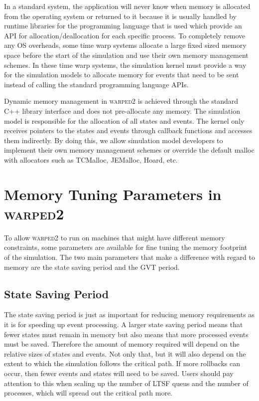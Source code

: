 \documentclass[11pt]{book}
\begin{document}
In a standard system, the application will never know when memory is allocated from the operating
system or returned to it because it is usually handled by runtime libraries for the programming
language that is used which provide an API for allocation/deallocation for each specific
process. To completely remove any OS overheads, some time warp systems allocate a large fixed
sized memory space before the start of the simulation and use their own memory management
schemes. In these time warp systems, the simulation kernel must provide a way for the simulation
models to allocate memory for events that need to be sent instead of calling the standard programming
language APIs.

Dynamic memory management in \textsc{warped2} is achieved through the standard C++ library
interface and does not pre-allocate any memory. The simulation model is responsible for the
allocation of all states and events. The kernel only receives pointers to the states and events
through callback functions and accesses them indirectly. By doing this, we allow simulation model
developers to implement their own memory management schemes or override the default malloc with
allocators such as TCMalloc, JEMalloc, Hoard, etc.

\section{Memory Tuning Parameters in \textsc{warped2}}

To allow \textsc{warped2} to run on machines that might have different memory constraints,
some parameters are available for fine tuning the memory footprint of the simulation. The
two main parameters that make a difference with regard to memory are the state saving period
and the GVT period.

\subsection{State Saving Period}

The state saving period is just as important for reducing memory requirements as it is for
speeding up event processing. A larger state saving period means that fewer states must remain
in memory but also means that more processed events must be saved. Therefore the amount of
memory required will depend on the relative sizes of states and events. Not only that, but it
will also depend on the extent to which the simulation follows the critical path. If more
rollbacks can occur, then fewer events and states will need to be saved. Users should pay attention
to this when scaling up the number of LTSF queus and the number of processes, which will spread
out the critical path more.
\end{document}
